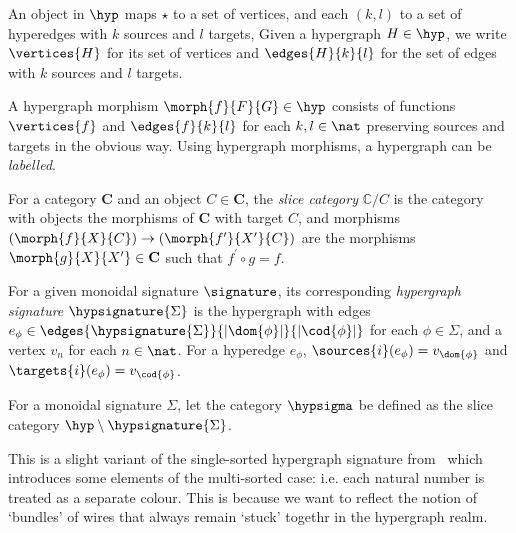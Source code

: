 An object in \(\hyp\) maps \(\star\) to a set of vertices, and each \((k,l)\) to
a set of hyperedges with \(k\) sources and \(l\) targets,
Given a hypergraph \(H \in \hyp\), we write \(\vertices{H}\) for its set of
vertices and \(\edges{H}{k}{l}\) for the set of edges with \(k\) sources and
\(l\) targets.

A hypergraph morphism \(\morph{f}{F}{G} \in \hyp\) consists of functions
\(\vertices{f}\) and \(\edges{f}{k}{l}\) for each \(k,l \in \nat\) preserving
sources and targets in the obvious way.
Using hypergraph morphisms, a hypergraph can be \emph{labelled}.

\begin{definition}
    For a category \(\mathbf{C}\) and an object \(C \in \mathbf{C}\), the
    \emph{slice category} \(\mathbb{C} / C\) is the category with objects the
    morphisms of \(\mathbf{C}\) with target \(C\), and morphisms \(
        (\morph{f}{X}{C}) \to (\morph{f^\prime}{X^\prime}{C})
    \) are the morphisms \(\morph{g}{X}{X^\prime} \in \mathbf{C}\) such that
    \(f^\prime \circ g = f\).
\end{definition}


\begin{definition}
    For a given monoidal signature \(\signature\), its corresponding
    \emph{hypergraph signature} \(\hypsignature{\Sigma}\) is the hypergraph with
    edges \(
        e_\phi \in \edges{\hypsignature{\Sigma}}{|\dom{\phi}|}{|\cod{\phi}|}
    \) for each \(\phi \in \Sigma\), and a vertex \(v_n\) for each
    \(n \in \nat\).
    For a hyperedge \(e_\phi\), \(
        \sources{i}(e_\phi) = v_{\dom{\phi}}
    \) and \(
        \targets{i}(e_\phi) = v_{\cod{\phi}}
    \).
\end{definition}

\begin{definition}
    For a monoidal signature \(\Sigma\), let the category \(\hypsigma\) be
    defined as the slice category \(\hyp \setminus \hypsignature{\Sigma}\).
\end{definition}

\begin{remark}
    This is a slight variant of the single-sorted hypergraph signature
    from~\cite{bonchi2022string} which introduces some elements of the
    multi-sorted case: i.e. each natural number is treated as a separate colour.
    This is because we want to reflect the notion of `bundles' of wires that
    always remain `stuck' togethr in the hypergraph realm.
\end{remark}

